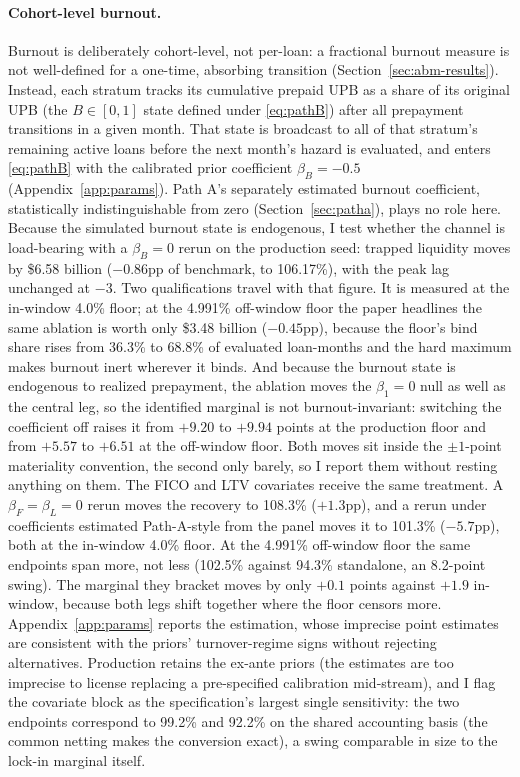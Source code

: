 \documentclass[12pt]{article}
\begin{document}
\paragraph{Cohort-level burnout.}
Burnout is deliberately cohort-level, not per-loan: a fractional burnout measure is not well-defined for a one-time, absorbing transition (Section~\ref{sec:abm-results}). Instead, each stratum tracks its cumulative prepaid UPB as a share of its original UPB (the $B \in [0,1]$ state defined under \eqref{eq:pathB}) after all prepayment transitions in a given month. That state is broadcast to all of that stratum's remaining active loans before the next month's hazard is evaluated, and enters \eqref{eq:pathB} with the calibrated prior coefficient $\beta_B = -0.5$ (Appendix~\ref{app:params}). Path A's separately estimated burnout coefficient, statistically indistinguishable from zero (Section~\ref{sec:patha}), plays no role here. Because the simulated burnout state is endogenous, I test whether the channel is load-bearing with a $\beta_B = 0$ rerun on the production seed: trapped liquidity moves by \$6.58 billion ($-0.86$pp of benchmark, to 106.17\%), with the peak lag unchanged at $-3$. Two qualifications travel with that figure. It is measured at the in-window 4.0\% floor; at the 4.991\% off-window floor the paper headlines the same ablation is worth only \$3.48 billion ($-0.45$pp), because the floor's bind share rises from 36.3\% to 68.8\% of evaluated loan-months and the hard maximum makes burnout inert wherever it binds. And because the burnout state is endogenous to realized prepayment, the ablation moves the $\beta_1 = 0$ null as well as the central leg, so the identified marginal is not burnout-invariant: switching the coefficient off raises it from $+9.20$ to $+9.94$ points at the production floor and from $+5.57$ to $+6.51$ at the off-window floor. Both moves sit inside the $\pm 1$-point materiality convention, the second only barely, so I report them without resting anything on them. The FICO and LTV covariates receive the same treatment. A $\beta_F = \beta_L = 0$ rerun moves the recovery to 108.3\% ($+1.3$pp), and a rerun under coefficients estimated Path-A-style from the panel moves it to 101.3\% ($-5.7$pp), both at the in-window 4.0\% floor. At the 4.991\% off-window floor the same endpoints span more, not less (102.5\% against 94.3\% standalone, an 8.2-point swing). The marginal they bracket moves by only $+0.1$ points against $+1.9$ in-window, because both legs shift together where the floor censors more. Appendix~\ref{app:params} reports the estimation, whose imprecise point estimates are consistent with the priors' turnover-regime signs without rejecting alternatives. Production retains the ex-ante priors (the estimates are too imprecise to license replacing a pre-specified calibration mid-stream), and I flag the covariate block as the specification's largest single sensitivity: the two endpoints correspond to 99.2\% and 92.2\% on the shared accounting basis (the common netting makes the conversion exact), a swing comparable in size to the lock-in marginal itself.
\end{document}
